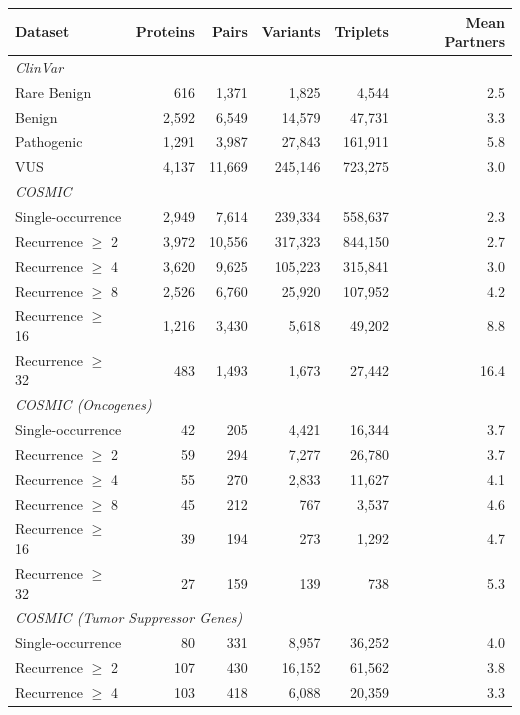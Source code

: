 \begin{tabular}{lrrrrr}
\hline
\textbf{Dataset} & \textbf{Proteins} & \textbf{Pairs} & \textbf{Variants} & \textbf{Triplets} & \textbf{Mean Partners} \\
\hline
\multicolumn{6}{l}{\textit{ClinVar}} \\
\quad Rare Benign & 616 & 1{,}371 & 1{,}825 & 4{,}544 & 2.5 \\
\quad Benign & 2{,}592 & 6{,}549 & 14{,}579 & 47{,}731 & 3.3 \\
\quad Pathogenic & 1{,}291 & 3{,}987 & 27{,}843 & 161{,}911 & 5.8 \\
\quad VUS & 4{,}137 & 11{,}669 & 245{,}146 & 723{,}275 & 3.0 \\
\hline
\multicolumn{6}{l}{\textit{COSMIC}} \\
\quad Single-occurrence & 2{,}949 & 7{,}614 & 239{,}334 & 558{,}637 & 2.3 \\
\quad Recurrence $\geq$ 2 & 3{,}972 & 10{,}556 & 317{,}323 & 844{,}150 & 2.7 \\
\quad Recurrence $\geq$ 4 & 3{,}620 & 9{,}625 & 105{,}223 & 315{,}841 & 3.0 \\
\quad Recurrence $\geq$ 8 & 2{,}526 & 6{,}760 & 25{,}920 & 107{,}952 & 4.2 \\
\quad Recurrence $\geq$ 16 & 1{,}216 & 3{,}430 & 5{,}618 & 49{,}202 & 8.8 \\
\quad Recurrence $\geq$ 32 & 483 & 1{,}493 & 1{,}673 & 27{,}442 & 16.4 \\
\hline
\multicolumn{6}{l}{\textit{COSMIC (Oncogenes)}} \\
\quad Single-occurrence & 42 & 205 & 4{,}421 & 16{,}344 & 3.7 \\
\quad Recurrence $\geq$ 2 & 59 & 294 & 7{,}277 & 26{,}780 & 3.7 \\
\quad Recurrence $\geq$ 4 & 55 & 270 & 2{,}833 & 11{,}627 & 4.1 \\
\quad Recurrence $\geq$ 8 & 45 & 212 & 767 & 3{,}537 & 4.6 \\
\quad Recurrence $\geq$ 16 & 39 & 194 & 273 & 1{,}292 & 4.7 \\
\quad Recurrence $\geq$ 32 & 27 & 159 & 139 & 738 & 5.3 \\
\hline
\multicolumn{6}{l}{\textit{COSMIC (Tumor Suppressor Genes)}} \\
\quad Single-occurrence & 80 & 331 & 8{,}957 & 36{,}252 & 4.0 \\
\quad Recurrence $\geq$ 2 & 107 & 430 & 16{,}152 & 61{,}562 & 3.8 \\
\quad Recurrence $\geq$ 4 & 103 & 418 & 6{,}088 & 20{,}359 & 3.3 \\

\end{tabular}
